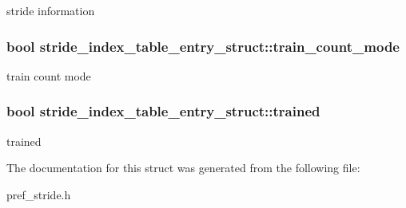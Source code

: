 \label{structstride__index__table__entry__struct_a4f2bc804c4b802bdfb6cbdf06483469b}
stride information \hypertarget{structstride__index__table__entry__struct_afcfbd0d9aeac71f62d04e2301fef245c}{
\subsubsection[{train\_\-count\_\-mode}]{\setlength{\rightskip}{0pt plus 5cm}bool {\bf stride\_\-index\_\-table\_\-entry\_\-struct::train\_\-count\_\-mode}}}
\label{structstride__index__table__entry__struct_afcfbd0d9aeac71f62d04e2301fef245c}
train count mode \hypertarget{structstride__index__table__entry__struct_a5567f13a120eb074d5c2a1c492deda1a}{
\subsubsection[{trained}]{\setlength{\rightskip}{0pt plus 5cm}bool {\bf stride\_\-index\_\-table\_\-entry\_\-struct::trained}}}
\label{structstride__index__table__entry__struct_a5567f13a120eb074d5c2a1c492deda1a}
trained 

The documentation for this struct was generated from the following file:\begin{DoxyCompactItemize}
\item 
pref\_\-stride.h\end{DoxyCompactItemize}

